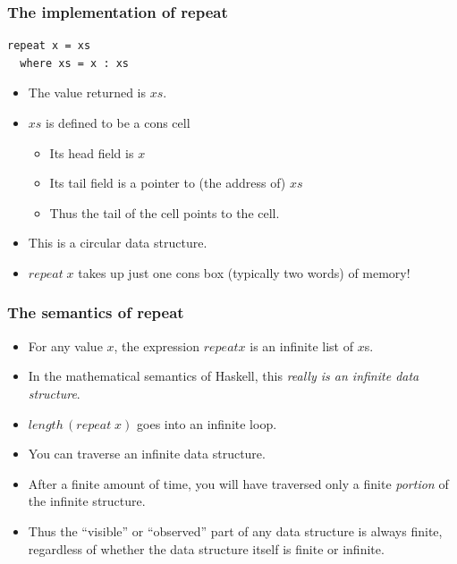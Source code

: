 \documentclass{beamer}
\begin{document}
\begin{frame}[fragile]
\frametitle{The implementation of repeat}

\begin{verbatim}
repeat x = xs
  where xs = x : xs
\end{verbatim}

\begin{itemize}
\item The value returned is $xs$.
\item $xs$ is defined to be a cons cell
  \begin{itemize}
  \item Its head field is $x$
  \item Its tail field is a pointer to (the address of) $xs$
  \item Thus the tail of the cell points to the cell.
  \end{itemize}
\item This is a circular data structure.
\item $repeat\; x$ takes up just one cons box (typically two words)
  of memory!
\end{itemize}

\end{frame}

\begin{frame}[fragile]
\frametitle{The semantics of repeat}

\begin{itemize}
\item For any value $x$, the expression $repeat x$ is an infinite
  list of $x$s.
\item In the mathematical semantics of Haskell, this \emph{really
    is an infinite data structure}.
\item $length\, (repeat\; x)$ goes into an infinite loop.
\item You can traverse an infinite data structure.
\item After a finite amount of time, you will have traversed only a
  finite \emph{portion} of the infinite structure.
\item Thus the ``visible'' or ``observed'' part of any data
  structure is always finite, regardless of whether the data
  structure itself is finite or infinite.
\end{itemize}

\end{frame}
\end{document}
